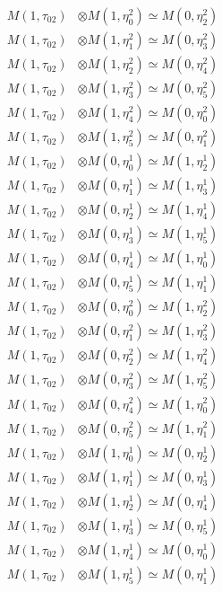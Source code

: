\begin{align*}
M(1,\tau_{02}) &\otimes M(1,\eta^{2}_{0}) \simeq M(0,\eta^{2}_{2}) \\
M(1,\tau_{02}) &\otimes M(1,\eta^{2}_{1}) \simeq M(0,\eta^{2}_{3}) \\
M(1,\tau_{02}) &\otimes M(1,\eta^{2}_{2}) \simeq M(0,\eta^{2}_{4}) \\
M(1,\tau_{02}) &\otimes M(1,\eta^{2}_{3}) \simeq M(0,\eta^{2}_{5}) \\
M(1,\tau_{02}) &\otimes M(1,\eta^{2}_{4}) \simeq M(0,\eta^{2}_{0}) \\
M(1,\tau_{02}) &\otimes M(1,\eta^{2}_{5}) \simeq M(0,\eta^{2}_{1}) \\
M(1,\tau_{02}) &\otimes M(0,\eta^{1}_{0}) \simeq M(1,\eta^{1}_{2}) \\
M(1,\tau_{02}) &\otimes M(0,\eta^{1}_{1}) \simeq M(1,\eta^{1}_{3}) \\
M(1,\tau_{02}) &\otimes M(0,\eta^{1}_{2}) \simeq M(1,\eta^{1}_{4}) \\
M(1,\tau_{02}) &\otimes M(0,\eta^{1}_{3}) \simeq M(1,\eta^{1}_{5}) \\
M(1,\tau_{02}) &\otimes M(0,\eta^{1}_{4}) \simeq M(1,\eta^{1}_{0}) \\
M(1,\tau_{02}) &\otimes M(0,\eta^{1}_{5}) \simeq M(1,\eta^{1}_{1}) \\
M(1,\tau_{02}) &\otimes M(0,\eta^{2}_{0}) \simeq M(1,\eta^{2}_{2}) \\
M(1,\tau_{02}) &\otimes M(0,\eta^{2}_{1}) \simeq M(1,\eta^{2}_{3}) \\
M(1,\tau_{02}) &\otimes M(0,\eta^{2}_{2}) \simeq M(1,\eta^{2}_{4}) \\
M(1,\tau_{02}) &\otimes M(0,\eta^{2}_{3}) \simeq M(1,\eta^{2}_{5}) \\
M(1,\tau_{02}) &\otimes M(0,\eta^{2}_{4}) \simeq M(1,\eta^{2}_{0}) \\
M(1,\tau_{02}) &\otimes M(0,\eta^{2}_{5}) \simeq M(1,\eta^{2}_{1}) \\
M(1,\tau_{02}) &\otimes M(1,\eta^{1}_{0}) \simeq M(0,\eta^{1}_{2}) \\
M(1,\tau_{02}) &\otimes M(1,\eta^{1}_{1}) \simeq M(0,\eta^{1}_{3}) \\
M(1,\tau_{02}) &\otimes M(1,\eta^{1}_{2}) \simeq M(0,\eta^{1}_{4}) \\
M(1,\tau_{02}) &\otimes M(1,\eta^{1}_{3}) \simeq M(0,\eta^{1}_{5}) \\
M(1,\tau_{02}) &\otimes M(1,\eta^{1}_{4}) \simeq M(0,\eta^{1}_{0}) \\
M(1,\tau_{02}) &\otimes M(1,\eta^{1}_{5}) \simeq M(0,\eta^{1}_{1}) \\
\end{align*}

